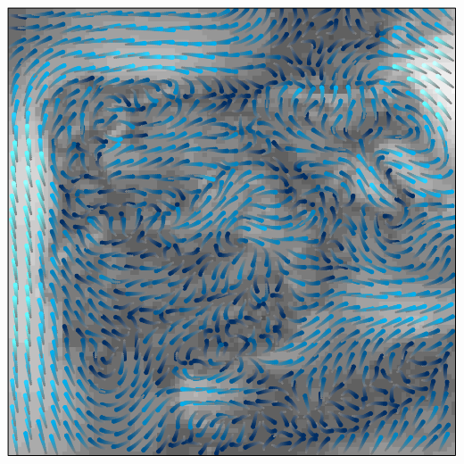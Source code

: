 \documentclass[xcolor={usenames,svgnames,dvipsnames}]{beamer}
\begin{document}
\begin{frame}[label=sec-5-6]{}
\includegraphics[width=.9\linewidth]{figs/streamplot.pdf}
\end{frame}

\begin{frame}[label=sec-5-7]{}

\end{frame}
\end{document}
